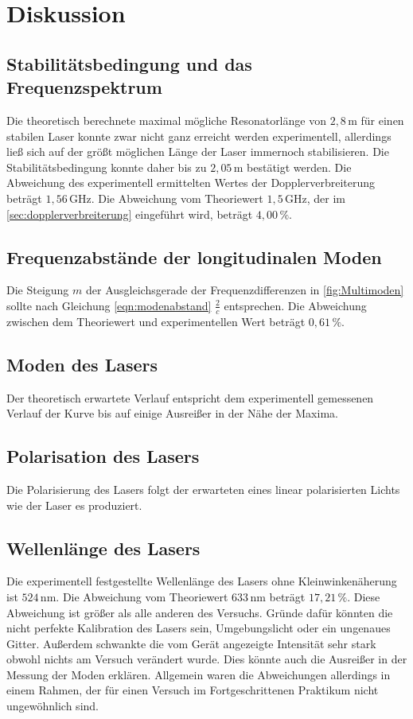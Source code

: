 \section{Diskussion}
\label{sec:Diskussion}

\subsection{Stabilitätsbedingung und das Frequenzspektrum}
Die theoretisch berechnete maximal mögliche Resonatorlänge von $2{,}8 \, \unit{\meter}$ für einen stabilen Laser konnte zwar nicht ganz erreicht werden experimentell, allerdings ließ sich auf der größt möglichen Länge der Laser immernoch stabilisieren. Die Stabilitätsbedingung konnte daher bis zu $2{,}05 \, \unit{\meter}$ bestätigt werden. 
Die Abweichung des experimentell ermittelten Wertes der Dopplerverbreiterung beträgt $1{,}56 \, \unit{\giga\hertz}$. Die Abweichung vom Theoriewert $1{,}5 \, \unit{\giga\hertz}$, der im \autoref{sec:dopplerverbreiterung} eingeführt wird, beträgt $4{,}00 \, \%$. 

\subsection{Frequenzabstände der longitudinalen Moden}
Die Steigung $m$ der Ausgleichsgerade der Frequenzdifferenzen in \autoref{fig:Multimoden} sollte nach Gleichung \ref{eqn:modenabstand} $\frac{2}{c}$ entsprechen. Die Abweichung zwischen dem Theoriewert und experimentellen Wert beträgt $0{,}61 \, \%$. 

\subsection{Moden des Lasers}
Der theoretisch erwartete Verlauf entspricht dem experimentell gemessenen Verlauf der Kurve bis auf einige Ausreißer in der Nähe der Maxima. 

\subsection{Polarisation des Lasers}
Die Polarisierung des Lasers folgt der erwarteten eines linear polarisierten Lichts wie der Laser es produziert. 

\subsection{Wellenlänge des Lasers} 
Die experimentell festgestellte Wellenlänge des Lasers ohne Kleinwinkenäherung ist $524 \, \unit{\nano\meter}$. Die Abweichung vom Theoriewert $633 \, \unit{\nano\meter}$ beträgt $17{,}21 \, \%$. Diese Abweichung ist größer als alle anderen des Versuchs. 
Gründe dafür könnten die nicht perfekte Kalibration des Lasers sein, Umgebungslicht oder ein ungenaues Gitter. Außerdem schwankte die vom Gerät angezeigte Intensität sehr stark obwohl nichts am Versuch verändert wurde. Dies könnte auch die Ausreißer in der Messung der Moden erklären. Allgemein waren die Abweichungen allerdings in einem Rahmen, der für einen Versuch im Fortgeschrittenen Praktikum nicht ungewöhnlich sind. 
